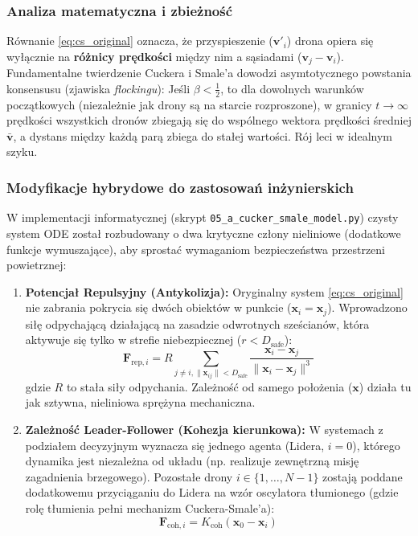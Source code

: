 \subsubsection{Analiza matematyczna i zbieżność}
Równanie \eqref{eq:cs_original} oznacza, że przyspieszenie ($\mathbf{v}'_i$) drona opiera się wyłącznie na \textbf{różnicy prędkości} między nim a sąsiadami ($\mathbf{v}_j - \mathbf{v}_i$). 
Fundamentalne twierdzenie Cuckera i Smale'a dowodzi asymtotycznego powstania konsensusu (zjawiska \textit{flockingu}): Jeśli $\beta < \frac{1}{2}$, to dla dowolnych warunków początkowych (niezależnie jak drony są na starcie rozproszone), w granicy $t \to \infty$ prędkości wszystkich dronów zbiegają się do wspólnego wektora prędkości średniej $\bar{\mathbf{v}}$, a dystans między każdą parą zbiega do stałej wartości. Rój leci w idealnym szyku.

\subsubsection{Modyfikacje hybrydowe do zastosowań inżynierskich}
W implementacji informatycznej (skrypt \texttt{05\_a\_cucker\_smale\_model.py}) czysty system ODE został rozbudowany o dwa krytyczne człony nieliniowe (dodatkowe funkcje wymuszające), aby sprostać wymaganiom bezpieczeństwa przestrzeni powietrznej:

\begin{enumerate}
    \item \textbf{Potencjał Repulsyjny (Antykolizja):} 
    Oryginalny system \eqref{eq:cs_original} nie zabrania pokrycia się dwóch obiektów w punkcie ($\mathbf{x}_i = \mathbf{x}_j$). Wprowadzono siłę odpychającą działającą na zasadzie odwrotnych sześcianów, która aktywuje się tylko w strefie niebezpiecznej ($r < D_{\text{safe}}$):
    \begin{equation}
        \mathbf{F}_{\text{rep}, i} = R \sum_{j \ne i, \|\mathbf{x}_{ij}\| < D_{\text{safe}}} \frac{\mathbf{x}_i - \mathbf{x}_j}{\|\mathbf{x}_i - \mathbf{x}_j\|^3}
    \end{equation}
    gdzie $R$ to stała siły odpychania. Zależność od samego położenia ($\mathbf{x}$) działa tu jak sztywna, nieliniowa sprężyna mechaniczna.
    
    \item \textbf{Zależność Leader-Follower (Kohezja kierunkowa):}
    W systemach z podziałem decyzyjnym wyznacza się jednego agenta (Lidera, $i=0$), którego dynamika jest niezależna od układu (np. realizuje zewnętrzną misję zagadnienia brzegowego). Pozostałe drony $i \in \{1,\dots,N-1\}$ zostają poddane dodatkowemu przyciąganiu do Lidera na wzór oscylatora tłumionego (gdzie rolę tłumienia pełni mechanizm Cuckera-Smale'a):
    \begin{equation}
        \mathbf{F}_{\text{coh}, i} = K_{\text{coh}} (\mathbf{x}_0 - \mathbf{x}_i)
    \end{equation}
\end{enumerate}

